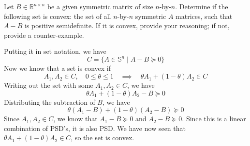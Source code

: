 \documentclass[11pt]{article}
\begin{document}
\begin{homeworkProblem}

Let $B \in \mathbb{R}^{n \times n}$ be a given symmetric matrix of size $n$-by-$n$. Determine if the following set is convex:
the set of all $n$-by-$n$ symmetric $A$ matrices, such that $A - B$ is positive semidefinite. If it is convex, provide your
reasoning; if not, provide a counter-example. \vspace{1\baselineskip}

\solution

Putting it in set notation, we have
\[
    C = \{A \in \mathbb{S}^{n} \mid A - B \succeq 0\}
\]
Now we know that a set is convex if 
\[
    A_1, A_2 \in C, \quad 0 \leq \theta \leq 1 \quad\implies\quad \theta A_1 + (1 - \theta) A_2 \in C
\]
Writing out the set with some $A_1, A_2 \in C$, we have
\[
    \theta A_1 + (1 - \theta) A_2 - B \succeq 0
\]
Distributing the subtraction of $B$, we have
\[
    \theta (A_1 - B) + (1 - \theta)(A_2 - B) \succeq 0
\]
Since $A_1, A_2 \in C$, we know that $A_1 - B \succeq 0$ and $A_2 - B \succeq 0$. Since this is a linear 
combination of PSD's, it is also PSD. We have now seen that $\theta A_1 + (1 - \theta) A_2 \in C$, so the set 
is convex.

\end{homeworkProblem}

\pagebreak
\end{document}
